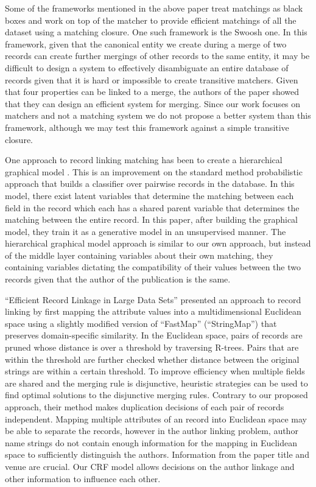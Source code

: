 \documentclass[]{article}
\begin{document}
Some of the frameworks mentioned in the above paper treat matchings as black boxes and work on top of the matcher to provide efficient matchings of all the dataset using a matching closure. One such framework is the Swoosh \cite{benjelloun2009swoosh} one. In this framework, given that the canonical entity we create during a merge of two records can create further mergings of other records to the same entity, it may be difficult to design a system to effectively disambiguate an entire database of records given that it is hard or impossible to create transitive matchers. Given that four properties can be linked to a merge, the authors of the paper showed that they can design an efficient system for merging. Since our work focuses on matchers and not a matching system we do not propose a better system than this framework, although we may test this framework against a simple transitive closure.

One approach to record linking matching has been to create a hierarchical graphical model \cite{ravikumar2012hierarchical}. This is an improvement on the standard method probabilistic approach that builds a classifier over pairwise records in the database. In this model, there exist latent variables that determine the matching between each field in the record which each has a shared parent variable that determines the matching between the entire record. In this paper, after building the graphical model, they train it as a generative model in an unsupervised manner. The hierarchical graphical model approach is similar to our own approach, but instead of the middle layer containing variables about their own matching, they containing variables dictating the compatibility of their values between the two records given that the author of the publication is the same.

``Efficient Record Linkage in Large Data Sets'' \cite{Jin2003} presented an approach to record linking by first mapping the attribute values into a multidimensional Euclidean space using a slightly modified version of ``FastMap'' (``StringMap'') that preserves domain-specific similarity.  In the Euclidean space, pairs of records are pruned whose distance is over a threshold by traversing R-trees.  Pairs that are within the threshold are further checked whether distance between the original strings are within a certain threshold.  To improve efficiency when multiple fields are shared and the merging rule is disjunctive, heuristic strategies can be used to find optimal solutions to the disjunctive merging rules.  Contrary to our proposed approach, their method makes duplication decisions of each pair of records independent.  Mapping multiple attributes of an record into Euclidean space may be able to separate the records, however in the author linking problem, author name strings do not contain enough information for the mapping in Euclidean space to sufficiently distinguish the authors.  Information from the paper title and venue are crucial.  Our CRF model allows decisions on the author linkage and other information to influence each other.
\end{document}
